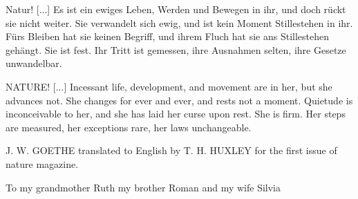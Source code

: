 
\begin{dedication} %

  Natur! [...] Es ist ein ewiges Leben, Werden und Bewegen in ihr, und
  doch rückt sie nicht weiter. Sie verwandelt sich ewig, und ist kein
  Moment Stillestehen in ihr. Fürs Bleiben hat sie keinen Begriff, und
  ihrem Fluch hat sie ans Stillestehen gehängt. Sie ist fest. Ihr
  Tritt ist gemessen, ihre Ausnahmen selten, ihre Gesetze unwandelbar.


  NATURE! [...] Incessant life, development, and movement are in her,
  but she advances not. She changes for ever and ever, and rests not a
  moment. Quietude is inconceivable to her, and she has laid her curse
  upon rest. She is firm. Her steps are measured, her exceptions rare,
  her laws unchangeable.

  J. W. GOETHE translated to English by T. H. HUXLEY for the first
  issue of nature magazine.

  \vspace{6cm}

  To my grandmother Ruth my brother Roman and my wife Silvia

\end{dedication}

